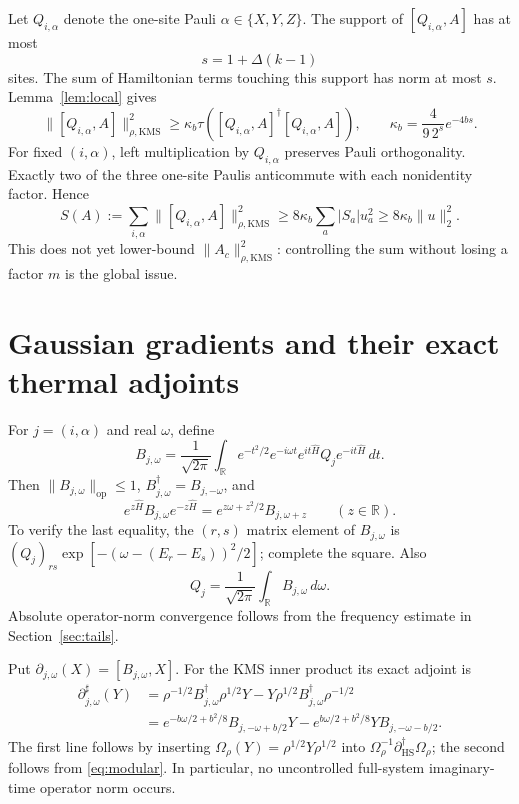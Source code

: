 \documentclass[11pt]{article}
\theoremstyle{remark}\newtheorem{remark}[theorem]{Remark}
\newcommand{\kn}[1]{\|#1\|_{\rho,\mathrm{KMS}}}
\newcommand{\op}[1]{\|#1\|_{\mathrm{op}}}
\newcommand{\R}{\mathbb R}\newcommand{\C}{\mathbb C}
\begin{document}
Let $Q_{i,\alpha}$ denote the one-site Pauli $\alpha\in\{X,Y,Z\}$. The support of $[Q_{i,\alpha},A]$ has at most
\[
 s=1+\Delta(k-1)
\]
sites. The sum of Hamiltonian terms touching this support has norm at most $s$. Lemma~\ref{lem:local} gives
\begin{equation}\label{eq:kappa}
 \kn{[Q_{i,\alpha},A]}^2\ge\kappa_b\tau([Q_{i,\alpha},A]^\dagger[Q_{i,\alpha},A]),
 \qquad \kappa_b=\frac4{9\,2^s}e^{-4bs}.
\end{equation}
For fixed $(i,\alpha)$, left multiplication by $Q_{i,\alpha}$ preserves Pauli orthogonality. Exactly two of the three one-site Paulis anticommute with each nonidentity factor. Hence
\begin{equation}\label{eq:gradient}
 S(A):=\sum_{i,\alpha}\kn{[Q_{i,\alpha},A]}^2
 \ge8\kappa_b\sum_a |S_a|u_a^2
 \ge8\kappa_b\|u\|_2^2.
\end{equation}
This does not yet lower-bound $\kn{A_c}^2$: controlling the sum without losing a factor $m$ is the global issue.

\section{Gaussian gradients and their exact thermal adjoints}
For $j=(i,\alpha)$ and real $\omega$, define
\begin{equation}\label{eq:B}
 B_{j,\omega}=\frac1{\sqrt{2\pi}}\int_\R e^{-t^2/2}e^{-i\omega t}
 e^{it\widehat H}Q_j e^{-it\widehat H}\,dt.
\end{equation}
Then $\op{B_{j,\omega}}\le1$, $B_{j,\omega}^\dagger=B_{j,-\omega}$, and
\begin{equation}\label{eq:modular}
 e^{z\widehat H}B_{j,\omega}e^{-z\widehat H}
 =e^{z\omega+z^2/2}B_{j,\omega+z}\qquad(z\in\R).
\end{equation}
To verify the last equality, the $(r,s)$ matrix element of $B_{j,\omega}$ is
$(Q_j)_{rs}\exp[-(\omega-(E_r-E_s))^2/2]$; complete the square.
Also
\begin{equation}\label{eq:reconstruction}
 Q_j=\frac1{\sqrt{2\pi}}\int_\R B_{j,\omega}\,d\omega.
\end{equation}
Absolute operator-norm convergence follows from the frequency estimate in Section~\ref{sec:tails}.

Put $\partial_{j,\omega}(X)=[B_{j,\omega},X]$. For the KMS inner product its exact adjoint is
\begin{align}\label{eq:adjoint}
 \partial_{j,\omega}^{\sharp}(Y)
 &=\rho^{-1/2}B_{j,\omega}^\dagger\rho^{1/2}Y
   -Y\rho^{1/2}B_{j,\omega}^\dagger\rho^{-1/2}\\
 &=e^{-b\omega/2+b^2/8}B_{j,-\omega+b/2}Y
   -e^{b\omega/2+b^2/8}YB_{j,-\omega-b/2}.\nonumber
\end{align}
The first line follows by inserting $\Omega_\rho(Y)=\rho^{1/2}Y\rho^{1/2}$ into $\Omega_\rho^{-1}\partial_{\mathrm{HS}}^\dagger\Omega_\rho$; the second follows from \eqref{eq:modular}. In particular, no uncontrolled full-system imaginary-time operator norm occurs.
\end{document}
